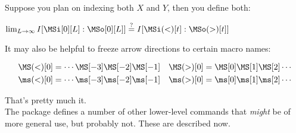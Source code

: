 \documentclass{article}
\begin{document}
Suppose you plan on indexing both $X$ and $Y$, then you define both:
\begin{LTXexample}[pos=b]
$\lim_{L \to \infty} I[ \MSi[0][L] : \MSo[0][L] ] \stackrel{?}{=} I[ \MSi(<)[t] : \MSo(>)[t]]$
\end{LTXexample}

It may also be helpful to freeze arrow directions to certain macro names:
\begin{LTXexample}[pos=b]
\newcommand{\Past}{\MS(<)}
\newcommand{\past}{\ms(<)}
\newcommand{\Future}{\MS(>)}
\newcommand{\future}{\ms(>)}
\begin{align*}
\Past[0] &= \cdots \MS[-3] \MS[-2] \MS[-1] &
\Future[0] &= \MS[0] \MS[1] \MS[2] \cdots \\
\past[0] &= \cdots \ms[-3] \ms[-2] \ms[-1] &
\future[0] &= \ms[0] \ms[1] \ms[2] \cdots \\
\end{align*}
\end{LTXexample}

That's pretty much it.\\

The package defines a number of other lower-level
commands that \emph{might} be of more general use, but probably not.
These are described now.
\end{document}
